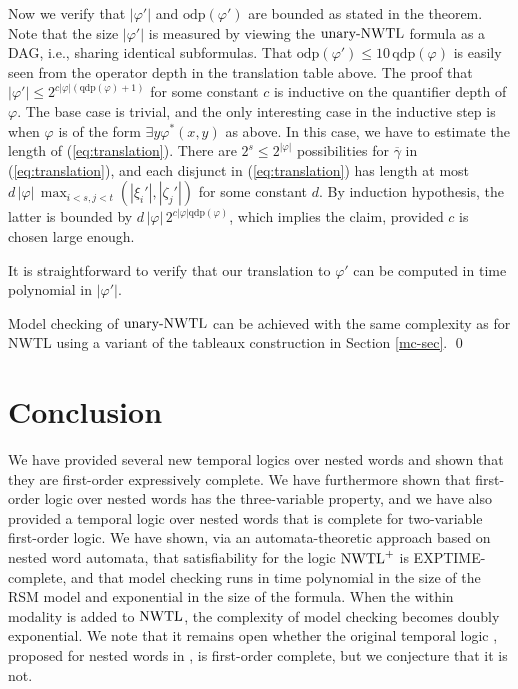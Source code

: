 \documentclass{LMCS}
\renewcommand{\phi}{\varphi}
\theoremstyle{plain}
\theoremstyle{definition}
\newcommand{\qdp}[1]{\mathrm{qdp}(#1)}
\newcommand{\odp}[1]{\mathrm{odp}(#1)}
\newcommand{\ucaret}{\text{unary-}\caret}
\renewcommand{\ucaret}{\text{unary-}\nwtl}
\newcommand{\caret}{\text{CaRet}}
\newcommand{\nwtlp}{\nwtl^+}
\begin{document}
Now we verify that $|\phi'|$ and $\odp{\phi'}$ are bounded as stated
in the theorem. 
Note that the size $|\phi'|$ is measured by viewing the $\ucaret$
formula as a DAG, i.e., sharing identical subformulas.
That $\odp{\phi'} \leq 10\, \qdp{\phi}$ is easily
seen from the operator depth in the translation table above. 
The proof that $|\phi'| \leq 2^{c |\phi| (\qdp{\phi } + 1)}$ for
some constant $c$ is inductive on the quantifier depth of $\phi$. The
base case is trivial, and the only interesting case in the inductive
step is when $\phi$ is of the form $\exists y \phi^*(x,y)$ as above.
In this case, we have to estimate the length of (\ref{eq:translation}).
There are $2^s \leq 2^{|\phi|}$ possibilities for $\overline{\gamma}$
in (\ref{eq:translation}), and each disjunct in (\ref{eq:translation}) has
length at most $d \, |\phi| \, \max_{i<s, j<t}(|\xi_i'|, |\zeta_j'|)$
for some constant $d$. By induction hypothesis, the latter is bounded
by $d \, |\phi| \, 2^{c |\phi| \qdp{\phi}}$, which implies the claim,
provided $c$ is chosen large enough.

It is straightforward to verify that our translation to $\phi'$ can
be computed in time polynomial in $|\phi'|$.

Model checking of $\ucaret$ can be achieved with the same complexity
as for NWTL using a variant of the tableaux construction in Section
\ref{mc-sec}.
\qed

\section{Conclusion}

\noindent We have provided several new temporal logics over nested words
and shown that they are first-order expressively complete. 
We have furthermore shown that first-order logic over nested
words has the three-variable property, and we have also
provided a temporal logic over nested words that is complete
for two-variable first-order logic.
We have
shown, via an automata-theoretic approach based on 
nested word automata, 
that satisfiability for 
the logic $\nwtlp$ is
EXPTIME-complete,
and that model checking runs in time polynomial in the size of the
RSM model and exponential in the size of the formula.
When the within modality is added to $\text{\rm NWTL}$, the complexity 
of model checking 
becomes doubly exponential.
We note that it remains open whether the original temporal logic \caret,
proposed for nested words 
in \cite{AEM04}, is first-order complete, but we conjecture that it is
not. 
\end{document}
